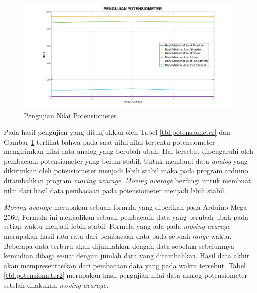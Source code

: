 	\begin{figure}[H]
	\centering
	\includegraphics[width=12cm]{gambar/pot.png}
	\caption{Pengujian Nilai Potensiometer}
	\label{pic.pot}
\end{figure}
Pada hasil pengujian yang ditunjukkan oleh Tabel \ref{tbl.potensiometer} dan Gambar \ref{pic.pot} terlihat bahwa pada saat nilai-nilai tertentu potensiometer  mengirimkan nilai data analog yang berubah-ubah. Hal tersebut dipengaruhi oleh pembacaan potensiometer yang belum stabil. Untuk membuat data \textit{analog} yang dikirimkan oleh potensiometer menjadi lebih stabil maka pada program arduino ditambahkan program \textit{moving avarage}. \textit{Moving avarage} berfungi untuk membuat nilai dari hasil data pembacaan pada potensiometer menjadi lebih stabil. 

\textit{Moving avarage} merupakan sebuah formula yang diberikan pada Arduino Mega 2560.  Formula ini menjadikan sebuah pembacaan data yang berubah-ubah pada setiap waktu menjadi lebih stabil. Formula yang ada pada \textit{moving avarage} merupakan hasil rata-rata dari pembacaan data pada sebuah \textit{range} waktu. Beberapa data terbaru akan dijumlahkan dengan data sebelum-sebelumnya kemudian dibagi sesuai dengan jumlah data yang ditambahkan. Hasil data akhir akan mempresentasikan dari pembacaan data yang pada waktu tersebut. Tabel \ref{tbl.potensiometer2} merupakan hasil pengujian nilai data analog potensiometer setelah dilakukan \textit{moving avarage.}

